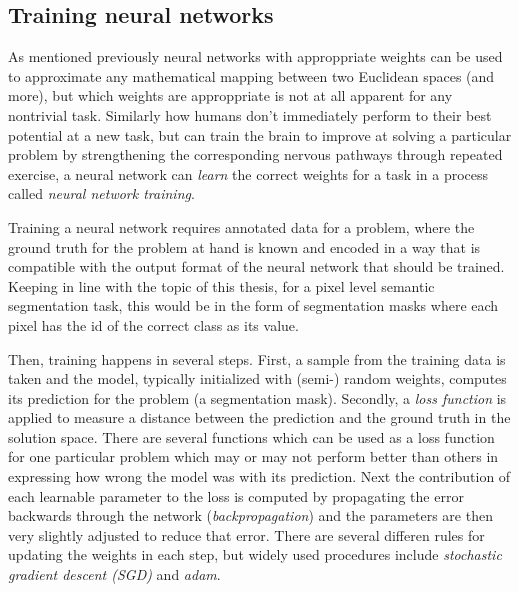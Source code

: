 \subsection{Training neural networks}
\label{sec:training}

As mentioned previously neural networks with approppriate weights can be used to approximate any mathematical mapping between two Euclidean spaces (and more), but which weights are approppriate is not at all apparent for any nontrivial task. Similarly how humans don't immediately perform to their best potential at a new task, but can train the brain to improve at solving a particular problem by strengthening the corresponding nervous pathways through repeated exercise, a neural network can \emph{learn} the correct weights for a task in a process called \emph{neural network training}.

Training a neural network requires annotated data for a problem, where the ground truth for the problem at hand is known and encoded in a way that is compatible with the output format of the neural network that should be trained. Keeping in line with the topic of this thesis, for a pixel level semantic segmentation task, this would be in the form of segmentation masks where each pixel has the id of the correct class as its value. 

Then, training happens in several steps. First, a sample from the training data is taken and the model, typically initialized with (semi-) random weights, computes its prediction for the problem (a segmentation mask). Secondly, a \emph{loss function} is applied to measure a distance between the prediction and the ground truth in the solution space. There are several functions which can be used as a loss function for one particular problem which may or may not perform better than others in expressing how wrong the model was with its prediction. Next the contribution of each learnable parameter to the loss is computed by propagating the error backwards through the network (\emph{backpropagation}) and the parameters are then very slightly adjusted to reduce that error. There are several differen rules for updating the weights in each step, but widely used procedures include \emph{stochastic gradient descent (SGD)} and \emph{adam}. 

